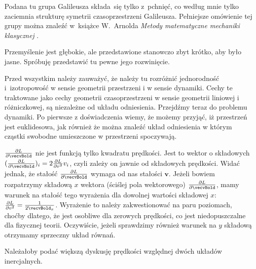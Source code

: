 \documentclass[a4paper,11pt]{article}
\numberwithin{equation}{section}
\begin{document}
\vspace{0em}


\noindent
{} Podana tu grupa Galileusza składa~się tylko z~pchnięć,
co według mnie tylko zaciemnia strukturę symetrii czasoprzestrzeni
Galileusza. Pełniejsze omówienie tej grupy można znaleźć w~książce
W.~Arnolda \textit{Metody matematyczne mechaniki klasycznej}
\cite{ArnoldMetodyMatematyczneMechanikiKlasycznej1981}.

\VerSpaceFour





\noindent
{} Przemyślenie jest głębokie, ale przedstawione
stanowczo zbyt krótko, aby było jasne. Spróbuję przedstawić tu pewne
jego rozwinięcie.

Przed wszystkim należy zauważyć, że należy tu rozróżnić jednorodność
i~izotropowość w sensie geometrii przestrzeni i w sensie dynamiki.
Cechy te traktowane jako cechy geometrii czasoprzestrzeni w sensie
geometrii liniowej i różniczkowej, są niezależne od układu
odniesienia. Przejdźmy teraz do problemu dynamiki. Po pierwsze z
doświadczenia wiemy, że możemy przyjąć, iż przestrzeń jest
euklidesowa, jak również że można znaleźć układ odniesienia w którym
cząstki swobodne umieszczone w przestrzeni spoczywają.

\VerSpaceFour





\noindent
{} $\frac{ \partial L }{ \partial \vecvBold }$ nie jest
funkcją tylko kwadratu prędkości. Jest to wektor o składowych
$( \frac{ \partial L }{ \partial \vecvBold } )_{ i }
= 2 \frac{ \partial L }{ \partial { v^{ 2 } } } v_{ i }$, czyli zależy on
jawnie od składowych prędkości. Widać jednak, że stałość
$\frac{ \partial L }{ \partial \vecvBold }$ wymaga od nas stałości
$\mathbf{ v }$. Jeżeli bowiem rozpatrzymy składową $x$ wektora
(ściślej pola wektorowego)
$\frac{ \partial L }{ \partial \vecvBold }$, mamy warunek na stałość
tego wyrażenia dla dowolnej wartości składowej $x$:
$\frac{ \partial L }{ \partial { v^{ 2 } } } = \frac{ 1 }{ 2 \vecvBold_{ x } }$.
Wyrażenie to należy zakwestionować na paru
poziomach, choćby dlatego, że jest osobliwe dla zerowych prędkości, co
jest niedopuszczalne dla fizycznej teorii. Oczywiście, jeżeli sprawdzimy
również warunek na $y$ składową otrzymamy sprzeczny układ równań.

\VerSpaceFour





\noindent
{} Należałoby podać większą dyskusję prędkości względnej dwóch
układów inercjalnych.
\end{document}
